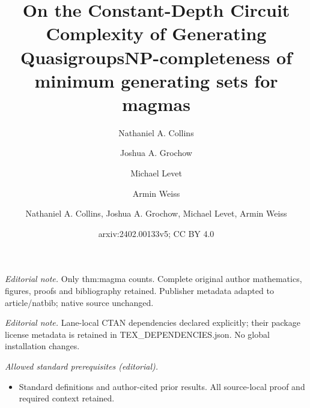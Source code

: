 \documentclass{article}
\title{On the Constant-Depth Circuit Complexity of Generating Quasigroups}
\author{Nathaniel A. Collins \and Joshua A. Grochow \and Michael Levet \and Armin Weiss}\date{}
\title{NP-completeness of minimum generating sets for magmas}
\author{Nathaniel A. Collins, Joshua A. Grochow, Michael Levet, Armin Weiss}
\date{arxiv:2402.00133v5; CC BY 4.0}
\begin{document}
\maketitle
\noindent\textit{Editorial note.} Only thm:magma counts. Complete original author mathematics, figures, proofs and bibliography retained. Publisher metadata adapted to article/natbib; native source unchanged.\par\medskip
\noindent\textit{Editorial note.} Lane-local CTAN dependencies declared explicitly; their package license metadata is retained in TEX\_DEPENDENCIES.json. No global installation changes.\par\medskip
\noindent\textit{Allowed standard prerequisites (editorial).}\begin{itemize}
\item Standard definitions and author-cited prior results. All source-local proof and required context retained.
\end{itemize}\medskip
\maketitle
\end{document}
